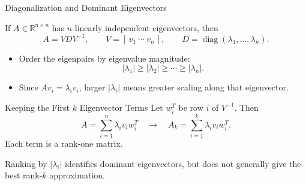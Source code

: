 \documentclass[10pt]{beamer}
\begin{document}
\begin{frame}{Diagonalization and Dominant Eigenvectors}

If $A\in\mathbb{R}^{n\times n}$ has $n$ linearly independent
eigenvectors, then
\[
    A=VDV^{-1},
    \qquad
    V=[\,v_1\ \cdots\ v_n\,],
    \qquad
    D=\operatorname{diag}(\lambda_1,\ldots,\lambda_n).
\]

\begin{itemize}
    \item Order the eigenpairs by eigenvalue magnitude:
    \[
        |\lambda_1|\geq|\lambda_2|\geq\cdots\geq|\lambda_n|.
    \]
    \item Since $Av_i=\lambda_i v_i$, larger $|\lambda_i|$
    means greater scaling along that eigenvector.
\end{itemize}

\begin{block}{Keeping the First $k$ Eigenvector Terms}
Let $w_i^T$ be row $i$ of $V^{-1}$. Then
\[
    A=\sum_{i=1}^{n}\lambda_i v_iw_i^T
    \quad\longrightarrow\quad
    A_k=\sum_{i=1}^{k}\lambda_i v_iw_i^T.
\]
Each term is a rank-one matrix.
\end{block}

\small
Ranking by $|\lambda_i|$ identifies dominant eigenvectors,
but does not generally give the best rank-$k$ approximation.


\end{frame}
\end{document}
